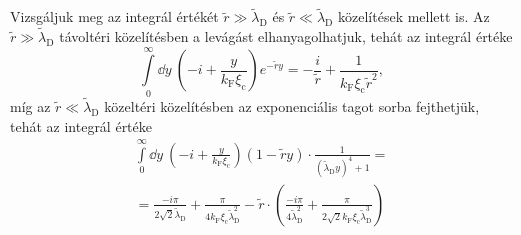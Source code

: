 \documentclass[a4paper,12pt,titlepage]{article}
\newcommand{\kF}{{k_\text{F}}}
\newcommand{\xic}{{\xi_\text{c}}}
\begin{document}
Vizsgáljuk meg az integrál értékét $\tilde{r} \gg \tilde{\lambda}_\text{D}$ és $\tilde{r} \ll \tilde{\lambda}_\text{D}$ közelítések mellett is.  Az $\tilde{r} \gg \tilde{\lambda}_\text{D}$ távoltéri közelítésben a levágást elhanyagolhatjuk, tehát az integrál értéke
\begin{equation} \label{g-n-far-field}
	\int\limits_0^\infty \dd{y} ~ \left( -i + \frac{y}{\kF \xic} \right) e^{-\tilde{r} y} = -\frac{i}{\tilde{r}} + \frac{1}{\kF \xic \tilde{r}^2},
\end{equation}
míg az $\tilde{r} \ll \tilde{\lambda}_\text{D}$ közeltéri közelítésben az exponenciális tagot sorba fejthetjük, tehát az integrál értéke
\begin{multline} \label{g-n-near-field}
	\int\limits_0^\infty \dd{y} ~ \left( -i + \frac{y}{\kF \xic} \right) \left( 1 - \tilde{r} y \right) \cdot \frac{1}{\left( \tilde{\lambda}_\text{D} y \right)^4 + 1} = \\
	= \frac{-i \pi}{2 \sqrt{2} \tilde{\lambda}_\text{D}} + \frac{\pi}{4 \kF \xic \tilde{\lambda}_\text{D}^2} - \tilde{r} \cdot \left( \frac{-i \pi}{4 \tilde{\lambda}_\text{D}^2} + \frac{\pi}{2 \sqrt{2} \kF \xic \tilde{\lambda}_\text{D}^3} \right)
\end{multline}
\end{document}
